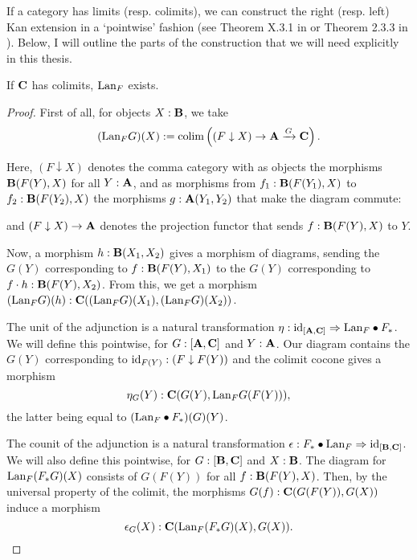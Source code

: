 If a category has limits (resp. colimits), we can construct the right (resp. left) Kan extension in a `pointwise' fashion (see Theorem X.3.1 in \autocite{MacLane} or Theorem 2.3.3 in \autocite{Kashiwara}). Below, I will outline the parts of the construction that we will need explicitly in this thesis.
\begin{lemma}
  If $ \mathbf{C} $ has colimits, $ \text{Lan}_{F} $ exists.
\end{lemma}
\begin{proof}
  First of all, for objects $ X: \mathbf{B} $, we take
  \[ (\text{Lan}_{F}G)(X) := \text{colim} \left( (F \downarrow X) \to \mathbf{A} \xrightarrow G \mathbf{C} \right). \]

  Here, $ (F \downarrow X) $ denotes the comma category with as objects the morphisms $ \mathbf{B}(F(Y), X) $ for all $ Y: \mathbf{A} $, and as morphisms from $ f_1: \mathbf{B}(F(Y_1), X) $ to $ f_2: \mathbf{B}(F(Y_2), X) $ the morphisms $ g: \mathbf{A}(Y_1, Y_2) $ that make the diagram commute:
  \begin{center}
  \end{center}
  and $ (F \downarrow X) \to \mathbf{A} $ denotes the projection functor that sends $ f: \mathbf{B}(F(Y), X) $ to $ Y $.

  Now, a morphism $ h: \mathbf{B}(X_1, X_2) $ gives a morphism of diagrams, sending the $ G(Y) $ corresponding to $ f: \mathbf{B}(F(Y), X_1) $ to the $ G(Y) $ corresponding to $ f \cdot h: \mathbf{B}(F(Y), X_2) $. From this, we get a morphism $ (\text{Lan}_{F}G)(h): \mathbf{C}((\text{Lan}_{F}G)(X_1), (\text{Lan}_{F}G)(X_2)) $.

  The unit of the adjunction is a natural transformation $ \eta: \text{id}_{[\mathbf{A}, \mathbf{C}]} \Rightarrow \text{Lan}_{F} \bullet F_* $. We will define this pointwise, for $ G: [\mathbf{A}, \mathbf{C}] $ and $ Y: \mathbf{A} $. Our diagram contains the $ G(Y) $ corresponding to $ \text{id}_{F(Y)}: (F \downarrow F(Y)) $ and the colimit cocone gives a morphism
  \[ \eta_G(Y) : \mathbf{C}(G(Y), \text{Lan}_{F}G (F(Y))), \]
  the latter being equal to $ (\text{Lan}_{F} \bullet F_*)(G)(Y) $.

  The counit of the adjunction is a natural transformation $ \epsilon: F_* \bullet \text{Lan}_{F} \Rightarrow \text{id}_{[\mathbf{B}, \mathbf{C}]} $. We will also define this pointwise, for $ G: [\mathbf{B}, \mathbf{C}] $ and $ X: \mathbf{B} $. The diagram for $ \text{Lan}_{F}(F_* G)(X) $ consists of $ G(F(Y)) $ for all $ f: \mathbf{B}(F(Y), X) $. Then, by the universal property of the colimit, the morphisms $ G(f): \mathbf{C}(G(F(Y)), G(X)) $ induce a morphism
  \[ \epsilon_G(X) : \mathbf{C}(\text{Lan}_{F}(F_* G)(X), G(X)). \]
\end{proof}

